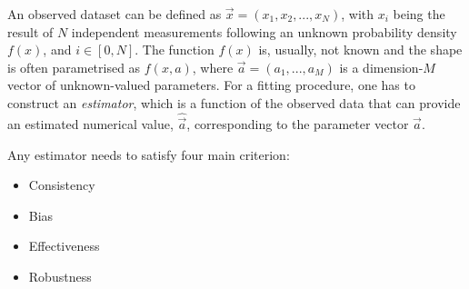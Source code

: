An observed dataset can be defined as $\vec{x} = (x_1, x_2,...,x_N)$, with $x_i$ being the result of $N$ independent measurements following an unknown probability density $f(x)$, and $i\in[0,N]$.
The function $f(x)$ is, usually, not known and the shape is often parametrised as $f(x, a)$, where $\vec{a}=(a_1,...,a_M)$ is a dimension-$M$ vector of unknown-valued parameters. 
For a fitting procedure, one has to construct an \textit{estimator}, which is a function of the observed data that can provide an estimated numerical value, $\hat{\vec{a}}$, corresponding to the parameter vector $\vec{a}$.

Any estimator needs to satisfy four main criterion:

\begin{itemize}
    \item Consistency
    \item Bias
    \item Effectiveness
    \item Robustness
\end{itemize}